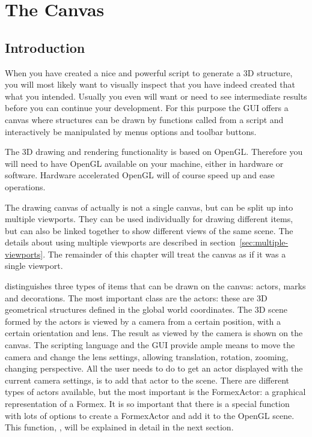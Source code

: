 
\chapter{The Canvas}
\label{cha:canvas}

\section{Introduction}
When you have created a nice and powerful script to generate a 3D structure, you will most likely want to visually inspect that you have indeed created that what you intended. Usually you even will want or need to see intermediate results before you can continue your development. 
For this purpose the \pyformex GUI offers a canvas where structures can be drawn by functions called from a script and interactively be manipulated by menus options and toolbar buttons.

The 3D drawing and rendering functionality is based on OpenGL. Therefore you will need to have OpenGL available on your machine, either in hardware or software. Hardware accelerated OpenGL will of course speed up and ease operations.

The drawing canvas of \pyformex actually is not a single canvas, but can be split up into multiple viewports. They can be used individually for drawing different items, but can also be linked together to show different views of the same scene. The details about using multiple viewports are described in section~\ref{sec:multiple-viewports}. The remainder of this chapter will treat the canvas as if it was a single viewport.

\pyformex distinguishes three types of items that can be drawn on the canvas: actors, marks and decorations. The most important class are the actors: these are 3D geometrical structures defined in the global world coordinates. The 3D scene formed by the actors is viewed by a camera from a certain position, with a certain orientation and lens. The result as viewed by the camera is shown on the canvas. The \pyformex scripting language and the GUI provide ample means to move the camera and change the lens settings, allowing translation, rotation, zooming, changing perspective. All the user needs to do to get an actor displayed with the current camera settings, is to add that actor to the scene. There are different types of actors available, but the most important is the FormexActor: a graphical representation of a Formex. It is so important that there is a special function with lots of options to create a FormexActor and add it to the OpenGL scene.
This function, , will be explained in detail in the next section.

